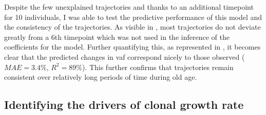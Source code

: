 \begin{figure}[!ht]
	\label{fig:ch-bad-trajectories-examples}
\end{figure}

Despite the few unexplained trajectories and thanks to an additional timepoint for 10 individuals, I was able to test the predictive performance of this model and the consistency of the trajectories. As visible in , most trajectories do not deviate greatly from a 6th timepoint which was not used in the inference of the coefficients for the model. Further quantifying this, as represented in , it becomes clear that the predicted changes in \ac{vaf} correspond nicely to those observed ($MAE = 3.4\%$, $R^2 = 89\%$). This further confirms that trajectories remain consistent over relatively long periods of time during old age.

\begin{figure}[!ht]
	\label{fig:trajectories-6th-tp}
\end{figure}

\begin{figure}[!ht]
	\label{fig:performance-6th-tp}
\end{figure}

\subsection{Identifying the drivers of clonal growth rate}

